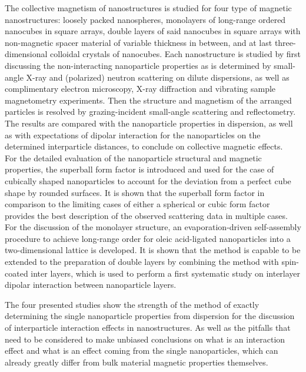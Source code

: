 \documentclass[\main/dresen_thesis.tex]{subfiles}
\begin{document}
  The collective magnetism of nanostructures is studied for four type of magnetic nanostructures: loosely packed nanospheres, monolayers of long-range ordered nanocubes in square arrays, double layers of said nanocubes in square arrays with non-magnetic spacer material of variable thickness in between, and at last three-dimensional colloidal crystals of nanocubes.
  Each nanostructure is studied by first discussing the non-interacting nanoparticle properties as is determined by small-angle X-ray and (polarized) neutron scattering on dilute dispersions, as well as complimentary electron microscopy, X-ray diffraction and vibrating sample magnetometry experiments.
  Then the structure and magnetism of the arranged particles is resolved by grazing-incident small-angle scattering and reflectometry.
  The results are compared with the nanoparticle properties in dispersion, as well as with expectations of dipolar interaction for the nanoparticles on the determined interparticle distances, to conclude on collective magnetic effects.
  \\

  For the detailed evaluation of the nanoparticle structural and magnetic properties, the superball form factor is introduced and used for the case of cubically shaped nanoparticles to account for the deviation from a perfect cube shape by rounded surfaces.
  It is shown that the superball form factor in comparison to the limiting cases of either a spherical or cubic form factor provides the best description of the observed scattering data in multiple cases.
  For the discussion of the monolayer structure, an evaporation-driven self-assembly procedure to achieve long-range order for oleic acid-ligated nanoparticles into a two-dimensional lattice is developed.
  It is shown that the method is capable to be extended to the preparation of double layers by combining the method with spin-coated inter layers, which is used to perform a first systematic study on interlayer dipolar interaction between nanoparticle layers.

  The four presented studies show the strength of the method of exactly determining the single nanoparticle properties from dispersion for the discussion of interparticle interaction effects in nanostructures.
  As well as the pitfalls that need to be considered to make unbiased conclusions on what is an interaction effect and what is an effect coming from the single nanoparticles, which can already greatly differ from bulk material magnetic properties themselves.
\end{document}
